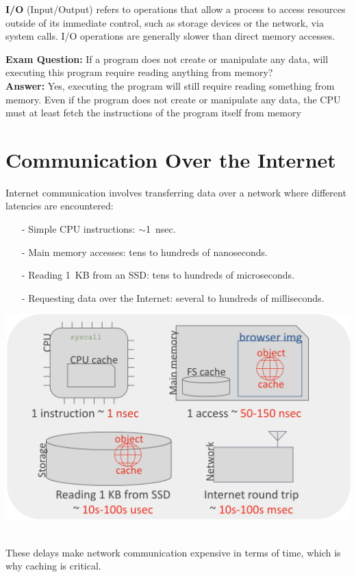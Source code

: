 \documentclass[../../compsys.tex]{subfiles}
\begin{document}
\vfill
\begin{definition}[I/O]
\textbf{I/O} (Input/Output) refers to operations that allow a process to access resources outside of its immediate control, such as storage devices or the network, via system calls. I/O operations are generally slower than direct memory accesses.
\end{definition}
\vspace{0.5em}
\textbf{Exam Question:} If a program does not create or manipulate any data, will executing this program require reading anything from memory?\\[0.5em]
\textbf{Answer:} Yes, executing the program will still require reading something from memory. Even if the program does not create or manipulate any data, the CPU must at least fetch the instructions of the program itself from memory

\newpage
\vfill
\section{Communication Over the Internet}
Internet communication involves transferring data over a network where different latencies are encountered: \\
\begin{minipage}{0.45\textwidth}
  \begin{itemize}
    \item[-] Simple CPU instructions: \(\sim\)1~nsec.
    \item[-] Main memory accesses: tens to hundreds of nanoseconds.
    \item[-] Reading 1~KB from an SSD: tens to hundreds of microseconds.
    \item[-] Requesting data over the Internet: several to hundreds of milliseconds.
\end{itemize}
\end{minipage}
\hfill
\vline
\hfill
\begin{minipage}{0.45\textwidth}
\begin{center}
  \includegraphics[width=1.15\textwidth]{chapters/L1/images/internet.png}
\end{center}
\end{minipage}\\[5px]
These delays make network communication expensive in terms of time, which is why caching is critical.
\vfill
\end{document}
